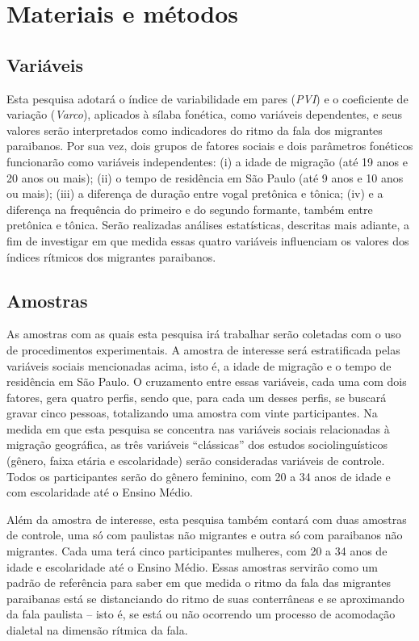 \documentclass[12pt,a4paper,oneside]{article}
\begin{document}
    \section{Materiais e métodos}

	\subsection{Variáveis}

	Esta pesquisa adotará o índice de variabilidade em pares (\emph{PVI}) e o coeficiente
	de variação (\emph{Varco}), aplicados à sílaba fonética, como variáveis
	dependentes, e seus valores serão interpretados como indicadores do ritmo da fala
	dos migrantes paraibanos. Por sua vez, dois grupos de fatores sociais e dois
	parâmetros fonéticos funcionarão como variáveis independentes: (i) a
	idade de migração (até 19 anos e 20 anos ou mais); (ii) o tempo de residência em São
	Paulo (até 9 anos e 10 anos ou mais); (iii) a diferença de duração entre vogal
	pretônica e tônica; (iv) e a diferença na frequência do primeiro e do segundo
	formante, também entre pretônica e tônica. Serão realizadas análises estatísticas,
	descritas mais adiante, a fim de investigar em que medida essas quatro
	variáveis influenciam os valores dos índices rítmicos dos migrantes paraibanos.

	\subsection{Amostras}

	As amostras com as quais esta pesquisa irá trabalhar serão coletadas com o uso de
	procedimentos experimentais. A amostra de interesse será estratificada pelas
	variáveis sociais mencionadas acima, isto é, a idade de migração e o tempo de residência
	em São Paulo. O cruzamento entre essas variáveis, cada uma com dois fatores, gera quatro
	perfis, sendo que, para cada um desses perfis, se buscará gravar cinco pessoas,
	totalizando uma amostra com vinte participantes. Na medida em que esta pesquisa se
	concentra nas variáveis sociais relacionadas à migração geográfica, as três variáveis
	\enquote{clássicas} dos estudos sociolinguísticos (gênero, faixa etária e escolaridade)
	serão consideradas variáveis de controle. Todos os participantes serão do gênero
	feminino, com 20 a 34 anos de idade e com escolaridade até o Ensino Médio.

	Além da amostra de interesse, esta pesquisa também contará com duas amostras
	de controle, uma só com paulistas não migrantes e outra só com paraibanos não
	migrantes.  Cada uma terá cinco participantes mulheres, com 20 a 34 anos de idade e
	escolaridade até o Ensino Médio. Essas amostras servirão como um padrão de
	referência para saber em que medida o ritmo da fala das migrantes paraibanas está se
	distanciando do ritmo de suas conterrâneas e se aproximando da fala paulista -- isto
	é, se está ou não ocorrendo um processo de acomodação dialetal na dimensão rítmica
	da fala.
\end{document}
